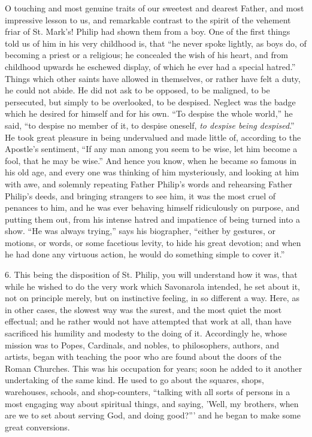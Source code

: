O touching and most genuine traits of our sweetest and
dearest Father, and most impressive lesson to us, and
remarkable contrast to the spirit of the vehement friar
of St. Mark's! Philip had shown them from a boy. One of
the first things told us of him in his very childhood is,
that ``he never spoke lightly, as boys do, of
becoming a priest or a religious; he concealed the wish
of his heart, and from childhood upwards he eschewed
display, of which he ever had a special hatred.''
Things which other saints have allowed in themselves, or
rather have felt a duty, he could not abide. He did not
ask to be opposed, to be maligned, to be persecuted, but
simply to be overlooked, to be despised. Neglect was the
badge which he desired for himself and for his own.
``To despise the whole world,'' he said, ``to
despise no member of it, to despise oneself, \emph{to
despise being despised}.'' He took great pleasure
in being undervalued and made little of, according to the
Apostle's sentiment, ``If any man among you seem to
be wise, let him become a fool, that he may be
wise.'' And hence you know, when he became so famous
in his old age, and every one was thinking of him
mysteriously, and looking at him with awe, and solemnly
repeating Father Philip's words and rehearsing Father
Philip's deeds, and bringing strangers to see him, it was
the most cruel of penances to him, and he was ever
behaving himself ridiculously on purpose, and putting
them out, from his intense hatred and impatience of being
turned into a show. ``He was always trying,''
says his biographer, ``either by gestures, or
motions, or words, or some facetious levity, to hide his
great devotion; and when he had done any virtuous action,
he would do something simple to cover it.''

6. This being the disposition of St. Philip, you will
understand how it was, that while he wished to do the
very work which Savonarola intended, he set about it, not
on principle merely, but on instinctive feeling, in so
different a way. Here, as in other cases, the slowest way
was the surest, and the most quiet the most effectual;
and he rather would not have attempted that work at all,
than have sacrificed his humility and modesty to the
doing of it. Accordingly he, whose mission was to Popes,
Cardinals, and nobles, to philosophers, authors, and
artists, began with teaching the poor who are found about
the doors of the Roman Churches. This was his occupation
for years; soon he added to it another undertaking of the
same kind. He used to go about the squares, shops,
warehouses, schools, and shop-counters, ``talking
with all sorts of persons in a most engaging way about
spiritual things, and saying, 'Well, my brothers, when
are we to set about serving God, and doing good?'''
and he began to make some great conversions.

